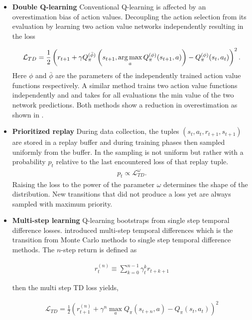 \begin{itemize}
	\item \textbf{Double Q-learning} \label{text:doublQ} \cite{DBLP:journals/corr/HasseltGS15} Conventional Q-learning is affected by an overestimation bias of action values. Decoupling the action selection from its evaluation by learning two action value networks independently resulting in the loss
	
	\begin{align}
		\mathcal{L}_{TD} = \frac{1}{2} \left(r_{t+1} + \gamma Q_{\pi}^{(\bar{\phi})} \left( s_{t+1}, \operatorname*{arg\,max}_{a}Q_{\pi}^{(\phi)}(s_{t+1}, a) \right) - Q_{\pi}^{(\phi)}(s_t, a_t)\right)^2\text{.}
	\end{align}
	Here $\phi$ and $\bar{\phi}$ are the parameters of the independently trained action value functions respectively. A similar method trains two action value functions independently and and takes for all evaluations the min value of the two network predictions. Both methods show a reduction in overestimation as shown in \cite{DBLP:journals/corr/HasseltGS15}.
	
	\item \textbf{Prioritized replay} During data collection, the tuples $(s_t, a_t, r_{t+1}, s_{t+1})$ are stored in a replay buffer and during training phases then sampled uniformly from the buffer. In \cite{schaul2015prioritized} the sampling is not uniform but rather with a probability $p_t$ relative to the last encountered loss of that replay tuple.
	\begin{align}
		p_t \propto \mathcal{L}_{TD} ^ \omega \text{.}
	\end{align}
	Raising the loss to the power of the parameter $\omega$ determines the shape of the distribution. New transitions that did not produce a loss yet are always sampled with maximum priority.
	
	\item \textbf{Multi-step learning} Q-learning bootstraps from single step temporal difference losses. \cite{SBQL} introduced multi-step temporal differences which is the transition from Monte Carlo methods to single step temporal difference methods. The $n$-step return is defined as 
	
	\begin{align}
		r_t^{(n)} \equiv \sum_{k=0}^{n-1} \gamma_t^{k} r_{t+k+1}
	\end{align}
	
	then the multi step TD loss yields,
	
	\begin{align}
		\mathcal{L}_{TD} = \frac{1}{2} \left(r_{t+1}^{(n)} + \gamma^{n} \max_{a}Q_{\pi}(s_{t+n}, a) - Q_{\pi}(s_t, a_t)\right)^2
	\end{align}
	

\end{itemize}

